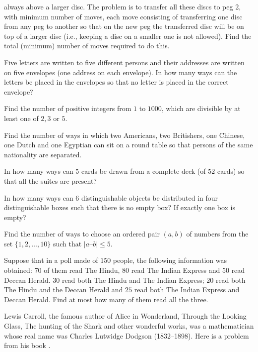   always above a larger disc. The problem is to transfer all these discs to peg 2, with minimum number of
  moves, each move consisting of transferring one disc from any peg to another so that on the new peg the
  transferred disc will be on top of a larger disc (i.e., keeping a disc on a smaller one is not
  allowed). Find the total (minimum) number of moves required to do this.
\item Five letters are written to five different persons and their addresses are written on five envelopes
  (one address on each envelope). In how many ways can the letters be placed in the envelopes so that no
  letter is placed in the correct envelope?
\item Find the number of positive integers from $1$ to $1000$, which are divisible by at least one of $2, 3$
  or $5$.
\item Find the number of ways in which two Americans, two Britishers, one Chinese, one Dutch and one
  Egyptian can sit on a round table so that persons of the same nationality are separated.
\item In how many ways can $5$ cards be drawn from a complete deck (of $52$ cards) so that all the suites
  are present?
\item In how many ways can $6$ distinguishable objects be distributed in four distinguishable boxes such
  that there is no empty box? If exactly one box is empty?
\item Find the number of ways to choose an ordered pair $(a, b)$ of numbers from the set $\{1, 2,…, 10\}$
  such that $|a – b| \leq 5$.
\item Suppose that in a poll made of $150$ people, the following information was obtained: $70$ of them read
  The Hindu, $80$ read The Indian Express and $50$ read Deccan Herald. $30$ read both The Hindu and The
  Indian Express; $20$ read both The Hindu and the Deccan Herald and $25$ read both The Indian Express and
  Deccan Herald. Find at most how many of them read all the three.
\item Lewis Carroll, the famous author of Alice in Wonderland, Through the Looking Glass, The hunting of the
  Shark and other wonderful works, was a mathematician whose real name was Charles Lutwidge Dodgson
  (1832–1898). Here is a problem from his book .

